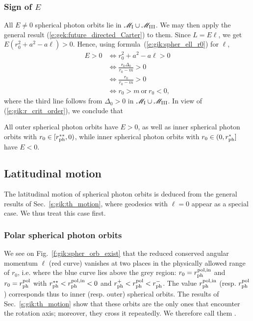 \subsubsection{Sign of $E$}

All $E\neq 0$ spherical photon orbits lie in $\mathscr{M}_{\rm I}\cup\mathscr{M}_{\rm III}$. We may then apply
the general result (\ref{e:gek:future_directed_Carter}) to them. Since $L = E \ell$, we get
$E (r_0^2 + a^2 - a \ell) > 0$.
Hence, using formula~(\ref{e:gik:spher_ell_r0}) for $\ell$,
\begin{align}
E > 0 & \iff r_0^2 + a^2 - a \ell > 0 \nonumber \\
      & \iff \frac{r_0 \Delta_0}{r_0 - m} > 0 \nonumber \\
      & \iff \frac{r_0}{r_0 - m} > 0  \nonumber \\
      & \iff r_0 > m \ \mbox{or}\ r_0 < 0 , \nonumber
\end{align}
where the third line follows from $\Delta_0 > 0$ in $\mathscr{M}_{\rm I}\cup\mathscr{M}_{\rm III}$.
In view of (\ref{e:gik:r_crit_order}), we conclude that
\begin{greybox}
All outer spherical photon orbits have $E>0$, as well as inner spherical photon
orbits with $r_0\in[r_{\rm ph}^{**}, 0)$, %
while inner spherical photon orbits with $r_0\in(0, r_{\rm ph}^*]$
have $E<0$.
\end{greybox}

\subsection{Latitudinal motion} \label{s:gik:spher_latitudinal}

The latitudinal motion of spherical photon orbits is
deduced from the general results of Sec.~\ref{s:gik:th_motion},
where geodesics with $\ell=0$ appear as a special case. We thus treat this
case first.

\subsubsection{Polar spherical photon orbits}

We see on Fig.~\ref{f:gik:spher_orb_exist} that the reduced conserved
angular momentum $\ell$ (red curve) vanishes at two
places in the physically allowed range of $r_0$,
i.e. where the blue curve lies above the grey region:
$r_0=r_{\rm ph}^{\rm pol,in}$ and $r_0=r_{\rm ph}^{\rm pol}$
with $r_{\rm ph}^{**} < r_{\rm ph}^{\rm pol,in} < 0$ and
$r_{\rm ph}^+ < r_{\rm ph}^{\rm pol} < r_{\rm ph}^-$.
The value $r_{\rm ph}^{\rm pol,in}$ (resp. $r_{\rm ph}^{\rm pol}$)
corresponds thus to inner (resp. outer) spherical orbits.
The results of Sec.~\ref{s:gik:th_motion} show that these orbits
are the only ones that encounter the rotation axis; moreover, they
cross it repeatedly.
We therefore call them
.

